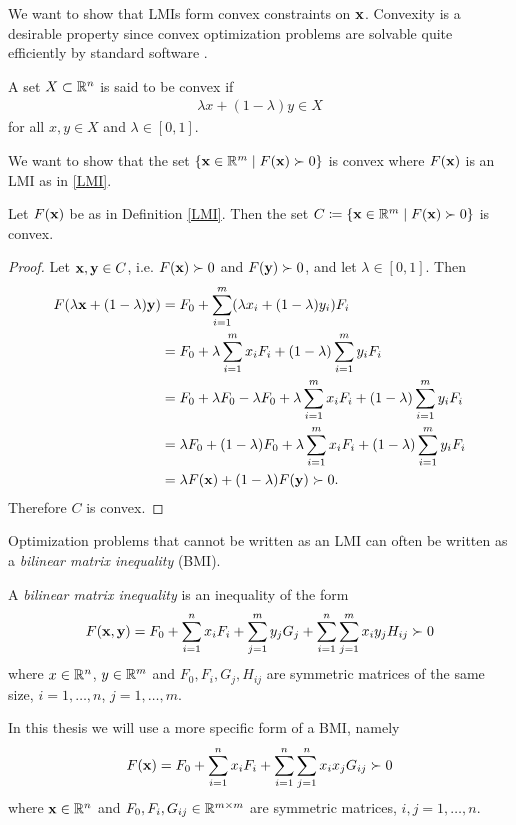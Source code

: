 \documentclass[a4paper,12pt,twoside,BCOR=10mm]{scrbook}
\begin{document}
We want to show that LMIs form convex constraints on $\mathbf{x}$. Convexity is a desirable property since convex optimization problems are solvable quite efficiently by standard software \citep{vABr2000lmibmi}.
\begin{definition}\label{Kýptni}
A set $X \subset \mathbb{R}^{n}$ is said to be convex if
    \begin{align*}
        \lambda x + (1 - \lambda)y \in X
    \end{align*}
for all $x,y\in X$ and $\lambda \in [0,1]$.
\end{definition}
We want to show that the set $\{\mathbf{x}\in\mathbb{R}^{m} \mid F(\mathbf{x}) \succ 0\}$ is convex where $F(\mathbf{x})$ is an LMI as in \eqref{LMI}.
\begin{theorem}\label{KýptniLMI}
Let $F(\mathbf{x})$ be as in Definition \ref{LMI}. Then the set $C \coloneqq \{\mathbf{x}\in\mathbb{R}^{m} \mid F(\mathbf{x}) \succ 0\}$ is convex.
\end{theorem}
\begin{proof}
Let $\mathbf{x}, \mathbf{y} \in C$, i.e. $F(\mathbf{x}) \succ 0$ and $F(\mathbf{y}) \succ 0$, and let $\lambda \in [0,1]$. Then
\begin{align*}
    F(\lambda\mathbf{x} + (1 - \lambda)\mathbf{y}) &= F_0 + \sum\limits_{i = 1}^m (\lambda x_i + (1 - \lambda)y_i)F_i\\
    &= F_0 + \lambda \sum\limits_{i = 1}^m x_i F_i + (1 - \lambda)\sum\limits_{i = 1}^m y_i F_i\\
    &= F_0 + \lambda F_0 - \lambda F_0 + \lambda \sum\limits_{i = 1}^m x_i F_i + (1 - \lambda)\sum\limits_{i = 1}^m y_i F_i\\
    &= \lambda F_0 + (1 - \lambda) F_0 + \lambda \sum\limits_{i = 1}^m x_i F_i + (1 - \lambda)\sum\limits_{i = 1}^m y_i F_i\\
    &= \lambda F(\mathbf{x}) + (1 - \lambda)F(\mathbf{y}) \succ 0.
\end{align*}
Therefore $C$ is convex.
\end{proof}

Optimization problems that cannot be written as an LMI can often be written as a \textit{bilinear matrix inequality} (BMI).

\begin{definition}\label{BMIDefinitionGeneral}
A \textit{bilinear matrix inequality} is an inequality of the form
    \begin{align}
        F(\mathbf{x}, \mathbf{y}) = F_0 + \sum_{i = 1}^nx_iF_i + \sum_{j = 1}^m y_jG_j + \sum_{i = 1}^n \sum_{j = 1}^m x_iy_j H_{ij} \succ 0
    \end{align}
where $x\in \mathbb{R}^{n}$, $y\in \mathbb{R}^{m}$ and $F_0, F_i, G_j, H_{ij}$ are symmetric matrices of the same size, $i = 1, \ldots, n$, $j = 1, \ldots, m$.
\end{definition}
In this thesis we will use a more specific form of a BMI, namely
\begin{align}\label{BMIDefinition}
    F(\mathbf{x}) = F_0 + \sum_{i = 1}^n x_i F_i + \sum_{i = 1}^n \sum_{j = 1}^n x_ix_j G_{ij} \succ 0
\end{align}
where $\mathbf{x} \in \mathbb{R}^{n}$ and $F_0, F_i, G_{ij} \in \mathbb{R}^{m \times m}$ are symmetric matrices, $i,j = 1, \ldots, n$.
\end{document}
